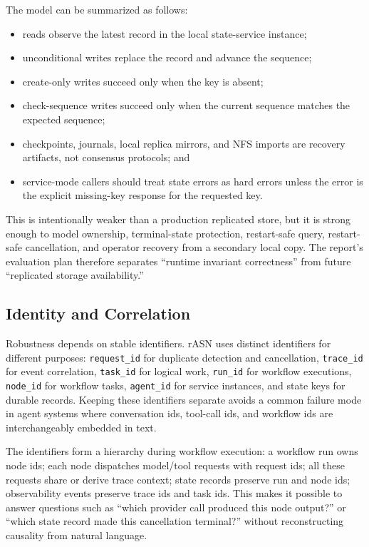 \documentclass[manuscript,screen,review]{acmart}
\newcommand{\rasn}{rASN\xspace}
\begin{document}
The model can be summarized as follows:

\begin{itemize}
  \item reads observe the latest record in the local state-service instance;
  \item unconditional writes replace the record and advance the sequence;
  \item create-only writes succeed only when the key is absent;
  \item check-sequence writes succeed only when the current sequence matches the
  expected sequence;
  \item checkpoints, journals, local replica mirrors, and NFS imports are recovery
  artifacts, not consensus protocols; and
  \item service-mode callers should treat state errors as hard errors unless the
  error is the explicit missing-key response for the requested key.
\end{itemize}

This is intentionally weaker than a production replicated store, but it is
strong enough to model ownership, terminal-state protection, restart-safe query,
restart-safe cancellation, and operator recovery from a secondary local copy. The
report's evaluation plan therefore separates ``runtime invariant correctness''
from future ``replicated storage availability.''

\subsection{Identity and Correlation}

Robustness depends on stable identifiers. \rasn uses distinct identifiers for
different purposes: \texttt{request\_id} for duplicate detection and
cancellation, \texttt{trace\_id} for event correlation, \texttt{task\_id} for
logical work, \texttt{run\_id} for workflow executions, \texttt{node\_id} for
workflow tasks, \texttt{agent\_id} for service instances, and state keys for
durable records. Keeping these identifiers separate avoids a common failure mode
in agent systems where conversation ids, tool-call ids, and workflow ids are
interchangeably embedded in text.

The identifiers form a hierarchy during workflow execution: a workflow run owns
node ids; each node dispatches model/tool requests with request ids; all these
requests share or derive trace context; state records preserve run and node ids;
observability events preserve trace ids and task ids. This makes it possible to
answer questions such as ``which provider call produced this node output?'' or
``which state record made this cancellation terminal?'' without reconstructing
causality from natural language.
\end{document}
